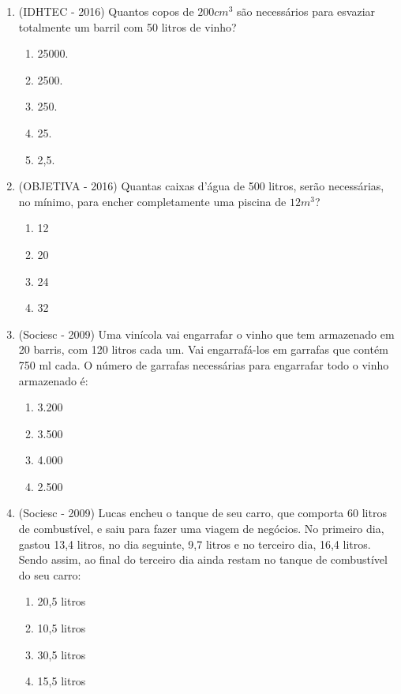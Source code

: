 \begin{enumerate}[1)]
 \item (IDHTEC - 2016) Quantos copos de $200 cm^3$ são necessários para esvaziar totalmente um barril com 50 litros de vinho?
 \begin{enumerate}
 \item 25000.
 \item 2500.
 \item 250.
 \item 25.
 \item 2,5.
\end{enumerate}

\item (OBJETIVA - 2016) Quantas caixas d’água de 500 litros, serão necessárias, no mínimo, para encher completamente uma piscina de $12m^3$?
\begin{enumerate}
 \item 12
 \item 20
 \item 24
 \item 32
\end{enumerate}

 \item (Sociesc - 2009) Uma vinícola vai engarrafar o vinho que tem armazenado em 20 barris, com 120 litros cada um. Vai engarrafá-los em garrafas que contém 750 ml cada. O número de garrafas necessárias para engarrafar todo o vinho armazenado é:
  \begin{enumerate}
  \item 3.200
  \item 3.500
  \item 4.000
  \item 2.500
 \end{enumerate}

  \item (Sociesc - 2009) Lucas encheu o tanque de seu carro, que comporta 60 litros de combustível, e saiu para fazer uma viagem de negócios. No primeiro dia, gastou 13,4 litros, no dia seguinte, 9,7 litros e no terceiro dia, 16,4 litros. Sendo assim, ao final do terceiro dia ainda restam no tanque de combustível do seu carro:
  \begin{enumerate}
  \item 20,5 litros
  \item 10,5 litros
  \item 30,5 litros
  \item 15,5 litros
 \end{enumerate}

\end{enumerate}


